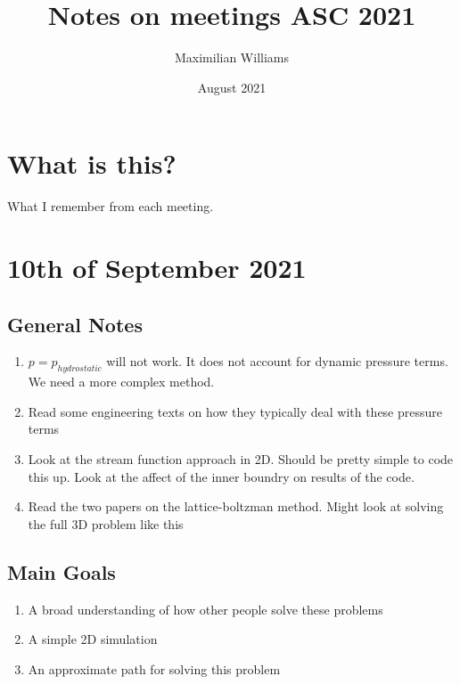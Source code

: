 \documentclass{article}
\title{Notes on meetings ASC 2021}
\author{Maximilian Williams }
\date{August 2021}
\begin{document}
\maketitle

\section*{What is this?}
What I remember from each meeting. 

\section*{10th of September 2021}
\subsection*{General Notes}
\begin{enumerate}
	\item $p = p_{hydrostatic}$ will not work. It does not account for dynamic pressure terms. We need a more complex method.
	\item Read some engineering texts on how they typically deal with these pressure terms
	\item Look at the stream function approach in 2D. Should be pretty simple to code this up. Look at the affect of the inner boundry on results of the code.
	\item Read the two papers on the lattice-boltzman method. Might look at solving the full 3D problem like this
\end{enumerate}


\subsection*{Main Goals}
\begin{enumerate}
	\item A broad understanding of how other people solve these problems
	\item A simple 2D simulation
	\item An approximate path for solving this problem
\end{enumerate}

\newpage
\end{document}
